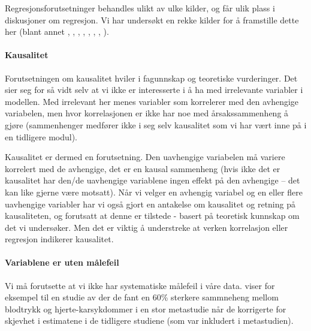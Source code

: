 \documentclass[
]{article}
\begin{document}
Regresjonsforutsetninger behandles ulikt av ulke kilder, og får ulik plass i diskusjoner om regresjon. Vi har undersøkt en rekke kilder for å framstille dette her (blant annet \citet{greenHowManySubjects1991}, \citet{berryUnderstandingRegressionAssumptions1993}, \citet{milesApplyingRegressionCorrelation2001}, \citet{hinkleAppliedStatisticsBehavioral2003}, \citet{tabachnikUsingMultivariateStatistics2007}, \citet{eikemoKvantitativAnalyseMed2007}, \citet{hairjr.MultivariateDataAnalysis2010}, \citet{lomaxStatisticalConceptsSecond2012}).

\hypertarget{kausalitet}{%
\paragraph{Kausalitet}\label{kausalitet}}

Forutsetningen om kausalitet hviler i fagunnskap og teoretiske vurderinger. Det sier seg for så vidt selv at vi ikke er interesserte i å ha med irrelevante variabler i modellen. Med irrelevant her menes variabler som korrelerer med den avhengige variabelen, men hvor korrelasjonen er ikke har noe med årsakssammenheng å gjøre (sammenhenger medfører ikke i seg selv kausalitet som vi har vært inne på i en tidligere modul).

Kausalitet er dermed en forutsetning. Den uavhengige variabelen må variere korrelert med de avhengige, det er en kausal sammenheng (hvis ikke det er kausalitet har den/de uavhengige variablene ingen effekt på den avhengige -- det kan like gjerne være motsatt). Når vi velger en avhengig variabel og en eller flere uavhengige variabler har vi også gjort en antakelse om kausalitet og retning på kausaliteten, og forutsatt at denne er tilstede - basert på teoretisk kunnskap om det vi undersøker. Men det er viktig å understreke at verken korrelasjon eller regresjon indikerer kausalitet.

\hypertarget{variablene-er-uten-muxe5lefeil}{%
\paragraph{Variablene er uten målefeil}\label{variablene-er-uten-muxe5lefeil}}

Vi må forutsette at vi ikke har systematiske målefeil i våre data. \citet{thoresenMalefeilRegresjonsanalyse2003} viser for eksempel til en studie av \citet{macmahonBloodPressureStroke1990} der de fant en 60\% sterkere sammneheng mellom blodtrykk og hjerte-karsykdommer i en stor metastudie når de korrigerte for skjevhet i estimatene i de tidligere studiene (som var inkludert i metastudien).
\end{document}
